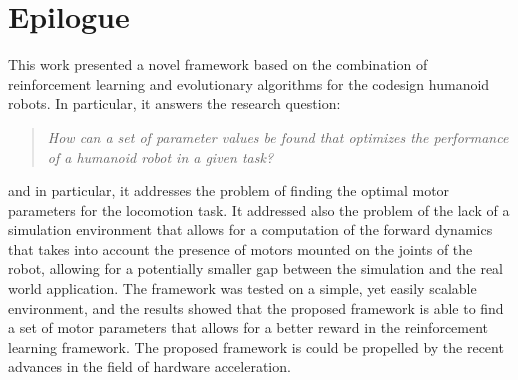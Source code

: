 \chapter*{Epilogue}
\label{chp:99-Epilogue}

This work presented a novel framework based on the combination of reinforcement learning and evolutionary algorithms for the codesign humanoid robots. In particular, it answers the research question:

\begin{quote}
    \textit{
        How can a set of parameter values be found that optimizes the performance of a humanoid robot in a given task?}
\end{quote}

and in particular, it addresses the problem of finding the optimal motor parameters for the locomotion task. It addressed also the problem of the lack of a simulation environment that allows for a computation of the forward dynamics that takes into account the presence of motors mounted on the joints of the robot, allowing for a potentially smaller gap between the simulation and the real world application.
The framework was tested on a simple, yet easily scalable environment, and the results showed that the proposed framework is able to find a set of motor parameters that allows for a better reward in the reinforcement learning framework.
The proposed framework is could be propelled by the recent advances in the field of hardware acceleration.